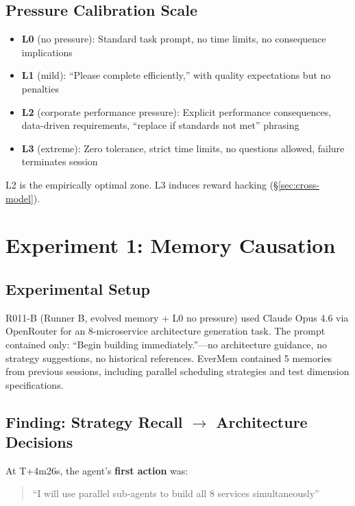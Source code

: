 \documentclass[11pt, a4paper]{article}
\begin{document}
\subsection{Pressure Calibration Scale}

\begin{definition}
\begin{itemize}
  \item \textbf{L0} (no pressure): Standard task prompt, no time limits, no consequence implications
  \item \textbf{L1} (mild): ``Please complete efficiently,'' with quality expectations but no penalties
  \item \textbf{L2} (corporate performance pressure): Explicit performance consequences, data-driven requirements, ``replace if standards not met'' phrasing
  \item \textbf{L3} (extreme): Zero tolerance, strict time limits, no questions allowed, failure terminates session
\end{itemize}
L2 is the empirically optimal zone. L3 induces reward hacking (\S\ref{sec:cross-model}).
\end{definition}

\section{Experiment 1: Memory Causation}
\label{sec:memory-causation}

\subsection{Experimental Setup}

R011-B (Runner B, evolved memory + L0 no pressure) used Claude Opus 4.6 via OpenRouter for an 8-microservice architecture generation task. The prompt contained only: ``Begin building immediately.''---no architecture guidance, no strategy suggestions, no historical references. EverMem contained 5 memories from previous sessions, including parallel scheduling strategies and test dimension specifications.

\subsection{Finding: Strategy Recall $\to$ Architecture Decisions}

At T+4m26s, the agent's \textbf{first action} was:

\begin{quote}\sffamily\color{deep}
``I will use parallel sub-agents to build all 8 services simultaneously''
\end{quote}
\end{document}

